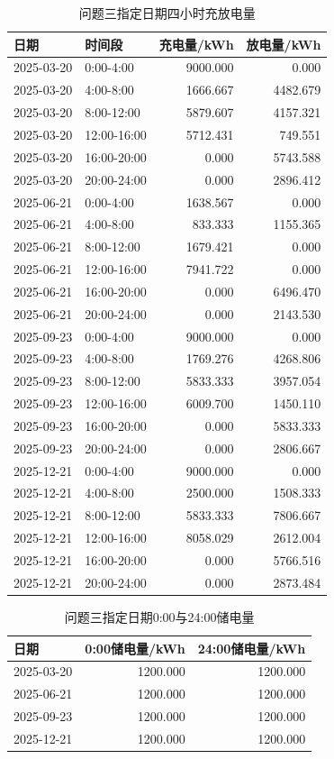 \documentclass[UTF8,12pt,a4paper]{ctexart}
\begin{document}
\begin{table}[H]\centering\scriptsize\caption{问题三指定日期四小时充放电量}\label{tab:q3storage_detail}
\begin{tabular}{llrr}\toprule 日期&时间段&充电量/kWh&放电量/kWh\\\midrule
2025-03-20&0:00-4:00&9000.000&0.000\\
2025-03-20&4:00-8:00&1666.667&4482.679\\
2025-03-20&8:00-12:00&5879.607&4157.321\\
2025-03-20&12:00-16:00&5712.431&749.551\\
2025-03-20&16:00-20:00&0.000&5743.588\\
2025-03-20&20:00-24:00&0.000&2896.412\\
2025-06-21&0:00-4:00&1638.567&0.000\\
2025-06-21&4:00-8:00&833.333&1155.365\\
2025-06-21&8:00-12:00&1679.421&0.000\\
2025-06-21&12:00-16:00&7941.722&0.000\\
2025-06-21&16:00-20:00&0.000&6496.470\\
2025-06-21&20:00-24:00&0.000&2143.530\\
2025-09-23&0:00-4:00&9000.000&0.000\\
2025-09-23&4:00-8:00&1769.276&4268.806\\
2025-09-23&8:00-12:00&5833.333&3957.054\\
2025-09-23&12:00-16:00&6009.700&1450.110\\
2025-09-23&16:00-20:00&0.000&5833.333\\
2025-09-23&20:00-24:00&0.000&2806.667\\
2025-12-21&0:00-4:00&9000.000&0.000\\
2025-12-21&4:00-8:00&2500.000&1508.333\\
2025-12-21&8:00-12:00&5833.333&7806.667\\
2025-12-21&12:00-16:00&8058.029&2612.004\\
2025-12-21&16:00-20:00&0.000&5766.516\\
2025-12-21&20:00-24:00&0.000&2873.484\\
\bottomrule\end{tabular}\end{table}
\begin{table}[H]\centering\scriptsize\caption{问题三指定日期0:00与24:00储电量}\label{tab:q3soc_detail}
\begin{tabular}{lrr}\toprule 日期&0:00储电量/kWh&24:00储电量/kWh\\\midrule
2025-03-20&1200.000&1200.000\\
2025-06-21&1200.000&1200.000\\
2025-09-23&1200.000&1200.000\\
2025-12-21&1200.000&1200.000\\
\bottomrule\end{tabular}\end{table}
\end{document}
